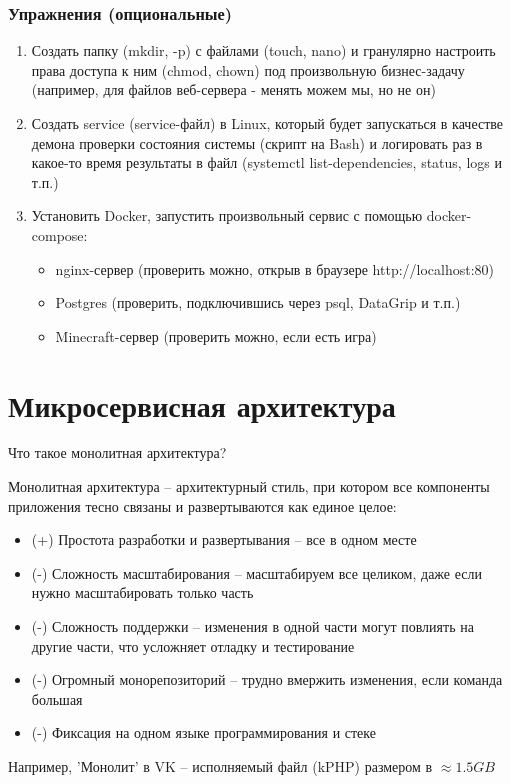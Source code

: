 \documentclass{beamer}
\begin{document}
\begin{frame}
\frametitle{Упражнения (опциональные)}

\begin{enumerate}
  \item Создать папку (mkdir, -p) с файлами (touch, nano) и гранулярно настроить права доступа к ним (chmod, chown)
     под произвольную бизнес-задачу (например, для файлов веб-сервера - менять можем мы, но не он)
  \item Создать service (service-файл) в Linux, который будет запускаться в качестве демона проверки состояния системы (скрипт на Bash) 
  и логировать раз в какое-то время результаты в файл (systemctl list-dependencies, status, logs и т.п.)
  \item Установить Docker, запустить произвольный сервис с помощью docker-compose:
  \begin{itemize}
    \item nginx-сервер (проверить можно, открыв в браузере http://localhost:80)
    \item Postgres (проверить, подключившись через psql, DataGrip и т.п.)
    \item Minecraft-сервер (проверить можно, если есть игра)
  \end{itemize}
\end{enumerate}

\end{frame}

\section{Микросервисная архитектура}

\begin{frame}{Что такое монолитная архитектура?}

Монолитная архитектура – архитектурный стиль, при котором все компоненты приложения тесно связаны и развертываются как единое целое:

\begin{itemize}
\item (+) Простота разработки и развертывания – все в одном месте
\item (-) Сложность масштабирования – масштабируем все целиком, даже если нужно масштабировать только часть
\item (-) Сложность поддержки – изменения в одной части могут повлиять на другие части, что усложняет отладку и тестирование
\item (-) Огромный монорепозиторий – трудно вмержить изменения, если команда большая
\item (-) Фиксация на одном языке программирования и стеке
\end{itemize}

Например, 'Монолит' в VK – исполняемый файл (kPHP) размером в $\approx 1.5 GB$

\end{frame}
\end{document}
